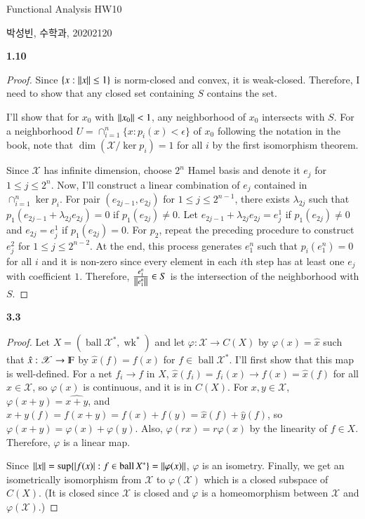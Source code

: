\documentclass[a4paper, 12pt]{article}
\theoremstyle{Mydefinition}
\theoremstyle{Mytheorem}
\DeclareMathOperator{\ball}{ball}
\DeclareMathOperator{\wk}{wk}
\begin{document}
\thispagestyle{myfirstpage}
\begin{center}
	\Large{Functional Analysis HW10}
\end{center}
박성빈, 수학과, 20202120

\noindent \textbf{1.10}
\begin{proof}
Since $\{x:\norm{x}\leq 1\}$ is norm-closed and convex, it is weak-closed. Therefore, I need to show that any closed set containing $S$ contains the set.

I'll show that for $x_0$ with $\norm{x_0}<1$, any neighborhood of $x_0$ intersects with $S$. For a neighborhood $U = \cap_{i=1}^n\{x:p_i(x)<\epsilon\}$ of $x_0$ following the notation in the book, note that $\dim(\mathscr{X}/\ker p_i) = 1$ for all $i$ by the first isomorphism theorem. 

Since $\mathscr{X}$ has infinite dimension, choose $2^n$ Hamel basis and denote it $e_j$ for $1\leq j\leq 2^n$. Now, I'll construct a linear combination of $e_j$ contained in $\cap_{i=1}^n \ker p_i$. For pair $(e_{2j-1}, e_{2j})$ for $1\leq j\leq 2^{n-1}$, there exists $\lambda_{2j}$ such that $p_1(e_{2j-1}+\lambda_{2j}e_{2j}) = 0$ if $p_1(e_{2j})\neq 0$. Let $e_{2j-1}+\lambda_{2j}e_{2j} = e^1_{j}$ if $p_1(e_{2j})\neq 0$ and $e_{2j} = e^1_{j}$ if $p_1(e_{2j})= 0$. For $p_2$, repeat the preceding procedure to construct $e^2_j$ for $1\leq j\leq 2^{n-2}$. At the end, this process generates $e^n_1$ such that $p_i(e^n_1) = 0$ for all $i$ and it is non-zero since every element in each $i$th step has at least one $e_j$ with coefficient $1$. Therefore, $\frac{e^n_1}{\norm{e^n_1}}\in S$ is the intersection of the neighborhood with $S$.
\end{proof}

\noindent \textbf{3.3}

\begin{proof}
Let $X = (\ball \mathscr{X}^*, \wk^*)$ and let $\varphi:\mathscr{X}\rightarrow C(X)$ by $\varphi(x) = \hat{x}$ such that $\hat{x}:\mathscr{X}\rightarrow \varmathbb{F}$ by $\hat{x}(f) = f(x)$ for $f\in \ball \mathscr{X}^*$. I'll first show that this map is well-defined. For a net $f_i\rightarrow f$ in $X$, $\hat{x}(f_i) = f_i(x)\rightarrow f(x) = \hat{x}(f)$ for all $x\in \mathscr{X}$, so $\varphi(x)$ is continuous, and it is in $C(X)$. For $x,y\in \mathscr{X}$, $\varphi(x+y) = \widehat{x+y}$, and $\widehat{x+y}(f)=f(x+y) = f(x)+f(y) = \hat{x}(f)+\hat{y}(f)$, so $\varphi(x+y)=\varphi(x)+\varphi(y)$. Also, $\varphi(rx) = r\varphi(x)$ by the linearity of $f\in X$. Therefore, $\varphi$ is a linear map.

Since $\norm{x} = \sup\{\abs{f(x)}:f\in \ball X^*\} = \norm{\varphi(x)}$, $\varphi$ is an isometry. Finally, we get an isometrically isomorphism from $\mathscr{X}$ to $\varphi(\mathscr{X})$ which is a closed subspace of $C(X)$. (It is closed since $\mathscr{X}$ is closed and $\varphi$ is a homeomorphism between $\mathscr{X}$ and $\varphi(\mathscr{X})$.)
\end{proof}
\end{document}
